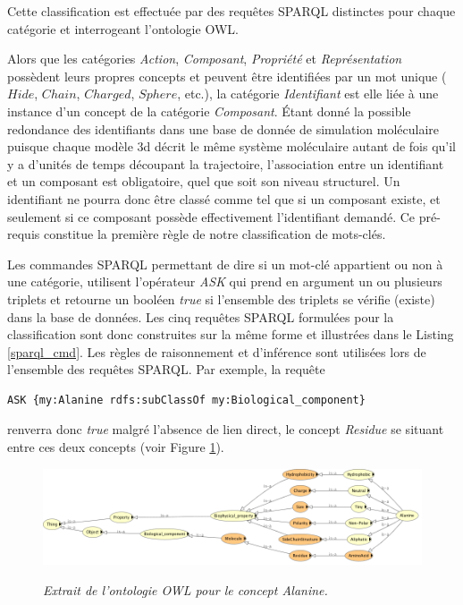 Cette classification est effectuée par des requêtes SPARQL distinctes pour chaque catégorie et interrogeant l'ontologie OWL.

Alors que les catégories \textit{Action}, \textit{Composant}, \textit{Propriété} et \textit{Représentation} possèdent leurs propres concepts et peuvent être identifiées par un mot unique ($Hide$, $Chain$, $Charged$, $Sphere$, etc.), la catégorie \textit{Identifiant} est elle liée à une instance d'un concept de la catégorie \textit{Composant}. Étant donné la possible redondance des identifiants dans une base de donnée de simulation moléculaire puisque chaque modèle 3d décrit le même système moléculaire autant de fois qu'il y a d'unités de temps découpant la trajectoire, l'association entre un identifiant et un composant est obligatoire, quel que soit son niveau structurel. Un identifiant ne pourra donc être classé comme tel que si un composant existe, et seulement si ce composant possède effectivement l'identifiant demandé. Ce pré-requis constitue la première règle de notre classification de mots-clés.

Les commandes SPARQL permettant de dire si un mot-clé appartient ou non à une catégorie, utilisent l'opérateur \textit{ASK} qui prend en argument un ou plusieurs triplets et retourne un booléen \textit{true} si l'ensemble des triplets se vérifie (existe) dans la base de données. Les cinq requêtes SPARQL formulées pour la classification sont donc construites sur la même forme et illustrées dans le Listing \ref{sparql_cmd}. Les règles de raisonnement et d'inférence sont utilisées lors de l'ensemble des requêtes SPARQL. Par exemple, la requête

\begin{lstlisting}[language=XML]
ASK {my:Alanine rdfs:subClassOf my:Biological_component}
\end{lstlisting}

renverra donc \textit{true} malgré l'absence de lien direct, le concept \textit{Residue} se situant entre ces deux concepts (voir Figure \ref{Fig:alanine_owl}).

\begin{figure}
  \centering
  {\includegraphics[width=0.8\linewidth]{./figures/ch5/alanine_owl}}
    \caption[Extrait de l'ontologie OWL pour le concept \textit{Alanine}.]{\it Extrait de l'ontologie OWL pour le concept \textit{Alanine}.}
  \label{Fig:alanine_owl}
  \hspace{0.3cm}
\end{figure}

